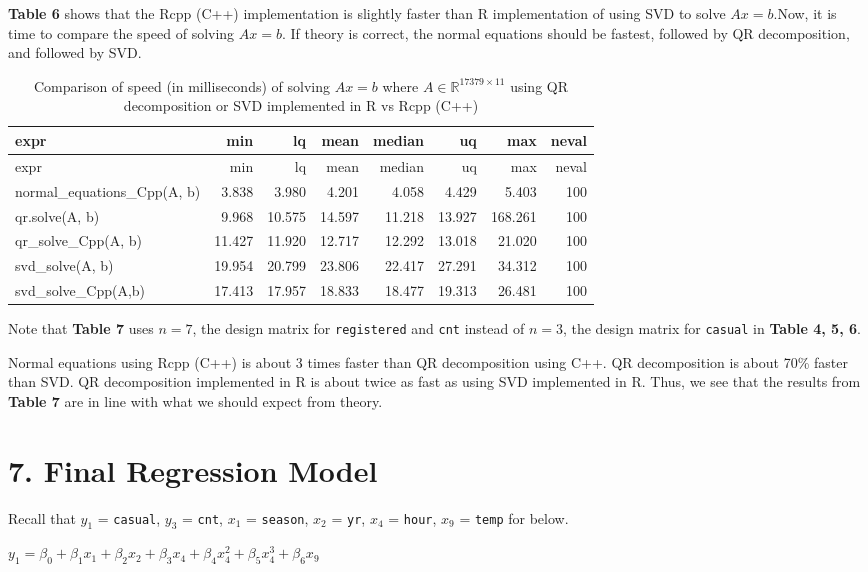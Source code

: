 \documentclass[
]{article}
\begin{document}
\textbf{Table 6} shows that the Rcpp (C++) implementation is slightly faster than R implementation of using SVD to solve \(Ax = b\).Now, it is time to compare the speed of solving \(Ax = b\). If theory is correct, the normal equations should be fastest, followed by QR decomposition, and followed by SVD.

\begin{longtable}[]{@{}lrrrrrrr@{}}
\caption{Comparison of speed (in milliseconds) of solving \(Ax = b\)
where \(A \in \mathbb{R}^{17379 \times 11}\) using QR decomposition or
SVD implemented in R vs Rcpp (C++)}\tabularnewline
\toprule
expr & min & lq & mean & median & uq & max & neval\tabularnewline
\midrule
\endfirsthead
\toprule
expr & min & lq & mean & median & uq & max & neval\tabularnewline
\midrule
\endhead
normal\_equations\_Cpp(A, b) & 3.838 & 3.980 & 4.201 & 4.058 & 4.429 &
5.403 & 100\tabularnewline
qr.solve(A, b) & 9.968 & 10.575 & 14.597 & 11.218 & 13.927 & 168.261 &
100\tabularnewline
qr\_solve\_Cpp(A, b) & 11.427 & 11.920 & 12.717 & 12.292 & 13.018 &
21.020 & 100\tabularnewline
svd\_solve(A, b) & 19.954 & 20.799 & 23.806 & 22.417 & 27.291 & 34.312 &
100\tabularnewline
svd\_solve\_Cpp(A,b) & 17.413 & 17.957 & 18.833 & 18.477 & 19.313 &
26.481 & 100\tabularnewline
\bottomrule
\end{longtable}

Note that \textbf{Table 7} uses \(n=7\), the design matrix for
\texttt{registered} and \texttt{cnt} instead of \(n=3\), the design
matrix for \texttt{casual} in \textbf{Table 4, 5, 6}.

Normal equations using Rcpp (C++) is about 3 times faster than QR
decomposition using C++. QR decomposition is about 70\% faster than SVD.
QR decomposition implemented in R is about twice as fast as using SVD
implemented in R. Thus, we see that the results from \textbf{Table 7}
are in line with what we should expect from theory.

\hypertarget{final-regression-model}{%
\section{7. Final Regression Model}\label{final-regression-model}}

Recall that \(y_{1}\) = \texttt{casual}, \(y_{3}\) = \texttt{cnt},
\(x_{1}\) = \texttt{season}, \(x_{2}\) = \texttt{yr}, \(x_{4}\) =
\texttt{hour}, \(x_{9}\) = \texttt{temp} for below.

\(y_{1} = \beta_{0} + \beta_{1}x_{1} + \beta_{2}x_{2} + \beta_{3}x_{4} + \beta_{4}x_{4}^{2} + \beta_{5}x_{4}^{3} + \beta_{6}x_{9}\)
\end{document}
